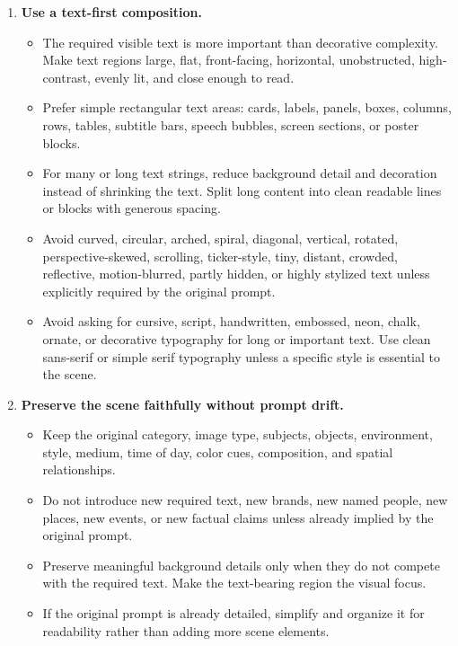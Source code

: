 \documentclass{llmxive}
\begin{document}
\begin{tcolorbox}
\begin{enumerate}[leftmargin=1.5em, itemsep=0.2em, topsep=0.2em, parsep=0pt, partopsep=0pt]
    \item \textbf{Use a text-first composition.}
    \begin{itemize}[leftmargin=1.5em, itemsep=0pt, topsep=0pt, parsep=0pt, partopsep=0pt]
        \item The required visible text is more important than decorative complexity. Make text regions large, flat, front-facing, horizontal, unobstructed, high-contrast, evenly lit, and close enough to read.
        \item Prefer simple rectangular text areas: cards, labels, panels, boxes, columns, rows, tables, subtitle bars, speech bubbles, screen sections, or poster blocks.
        \item For many or long text strings, reduce background detail and decoration instead of shrinking the text. Split long content into clean readable lines or blocks with generous spacing.
        \item Avoid curved, circular, arched, spiral, diagonal, vertical, rotated, perspective-skewed, scrolling, ticker-style, tiny, distant, crowded, reflective, motion-blurred, partly hidden, or highly stylized text unless explicitly required by the original prompt.
        \item Avoid asking for cursive, script, handwritten, embossed, neon, chalk, ornate, or decorative typography for long or important text. Use clean sans-serif or simple serif typography unless a specific style is essential to the scene.
    \end{itemize}

    \item \textbf{Preserve the scene faithfully without prompt drift.}
    \begin{itemize}[leftmargin=1.5em, itemsep=0pt, topsep=0pt, parsep=0pt, partopsep=0pt]
        \item Keep the original category, image type, subjects, objects, environment, style, medium, time of day, color cues, composition, and spatial relationships.
        \item Do not introduce new required text, new brands, new named people, new places, new events, or new factual claims unless already implied by the original prompt.
        \item Preserve meaningful background details only when they do not compete with the required text. Make the text-bearing region the visual focus.
        \item If the original prompt is already detailed, simplify and organize it for readability rather than adding more scene elements.
    \end{itemize}


\end{enumerate}
\end{tcolorbox}
\end{document}

